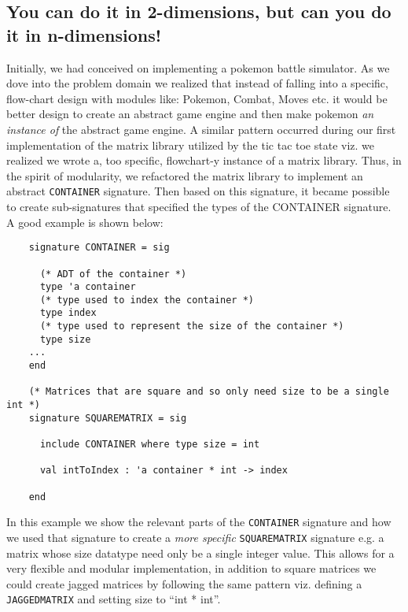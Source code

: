 \documentclass[9pt,letterpaper]{extarticle}
\begin{document}
  \subsection{You can do it in 2-dimensions, but can you do it in n-dimensions!}
  Initially, we had conceived on implementing a pokemon battle simulator. As we
  dove into the problem domain we realized that instead of falling into a
  specific, flow-chart design with modules like: Pokemon, Combat, Moves etc. it
  would be better design to create an abstract game engine and then make pokemon
  \textit{an instance of} the abstract game engine. A similar pattern occurred
  during our first implementation of the matrix library utilized by the tic tac
  toe state viz. we realized we wrote a, too specific, flowchart-y instance of a
  matrix library. Thus, in the spirit of modularity, we refactored the matrix
  library to implement an abstract \texttt{CONTAINER} signature. Then based on
  this signature, it became possible to create sub-signatures that specified the
  types of the CONTAINER signature. A good example is shown below:

  \begin{verbatim}
    signature CONTAINER = sig
    
      (* ADT of the container *)
      type 'a container
      (* type used to index the container *)
      type index
      (* type used to represent the size of the container *)
      type size
    ...
    end

    (* Matrices that are square and so only need size to be a single int *)
    signature SQUAREMATRIX = sig
    
      include CONTAINER where type size = int
    
      val intToIndex : 'a container * int -> index
    
    end

  \end{verbatim}
  In this example we show the relevant parts of the \texttt{CONTAINER} signature
  and how we used that signature to create a \textit{more specific}
  \texttt{SQUAREMATRIX} signature e.g. a matrix whose size datatype need only be
  a single integer value. This allows for a very flexible and modular
  implementation, in addition to square matrices we could create jagged matrices
  by following the same pattern viz. defining a \texttt{JAGGEDMATRIX} and
  setting size to ``int * int''.
\end{document}
